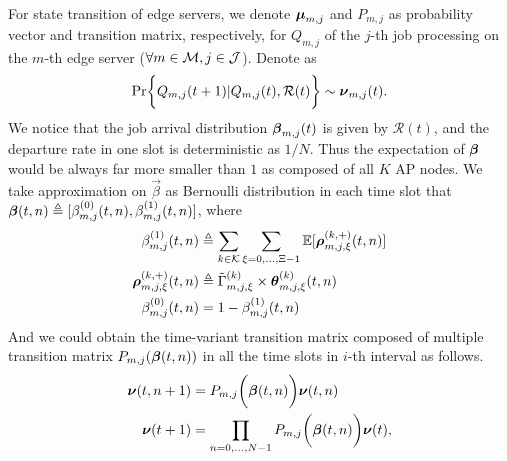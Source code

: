 For state transition of edge servers, we denote $\boldsymbol{\mu}_{m,j}$ and $P_{m,j}$ as probability vector and transition matrix, respectively, for $Q_{m,j}$ of the $j$-th job processing on the $m$-th edge server ($\forall m\in\mathcal{M}, j\in\mathcal{J}$).
Denote as
\begin{align}
    \Pr\Brace{ Q_{m,j}({t+1})|Q_{m,j}({t}), \mathcal{R}({t}) } \sim \vecG{\nu}_{m,j}({t}).
\end{align}
We notice that the job arrival distribution $\boldsymbol{\beta}_{m,j}({t})$ is given by $\mathcal{R}({t})$, and the departure rate in one slot is deterministic as $1/N$.
Thus the expectation of $\boldsymbol{\beta}$ would be always far more smaller than $1$ as composed of all $K$ AP nodes.
We take approximation on $\vec{\beta}$ as Bernoulli distribution in each time slot that $\boldsymbol{\beta}({t,n}) \triangleq [\beta^{(0)}_{m,j}({t,n}), \beta^{(1)}_{m,j}({t,n})]$, where
\begin{align}
    \beta^{(1)}_{m,j}({t,n}) &\triangleq \sum_{k\in\mathcal{K}} \sum_{\xi=0,\dots,\Xi-1} \mathbb{E}[\boldsymbol{\rho}^{(k,+)}_{m,j,\xi}({t,n})]
    \label{eqn_0}
    \\
    \boldsymbol{\rho}^{(k,+)}_{m,j,\xi}({t,n}) &\triangleq \tilde{\Gamma}^{(k)}_{m,j,\xi} \times \boldsymbol{\theta}^{(k)}_{m,j,\xi}({t,n})
    \\
    \beta^{(0)}_{m,j}({t,n}) &= 1-\beta^{(1)}_{m,j}({t,n})
\end{align}
And we could obtain the time-variant transition matrix composed of multiple transition matrix $P_{m,j}(\boldsymbol{\beta}({t,n}))$ in all the time slots in $i$-th interval as follows.
\begin{align}
    \boldsymbol{\nu}({t,n+1}) &= P_{m,j}\bigg(\boldsymbol{\beta}({t,n})\bigg) \boldsymbol{\nu}({t,n})
    \\
    \boldsymbol{\nu}({t+1}) &= \prod_{n=0,\dots,N-1} P_{m,j}\bigg(\boldsymbol{\beta}({t,n})\bigg) \boldsymbol{\nu}({t}),
    \label{eqn_4}
\end{align}

